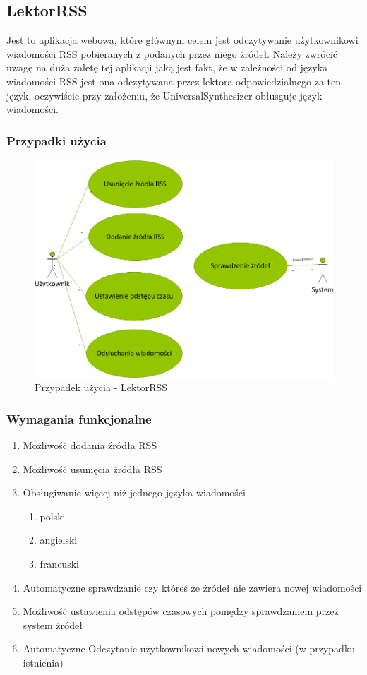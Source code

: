 \subsection{LektorRSS}
Jest to aplikacja webowa, które głównym celem jest odczytywanie użytkownikowi wiadomości RSS pobieranych z podanych przez niego źródeł. Należy zwrócić uwagę na duża zaletę tej aplikacji jaką jest fakt, że w zależności od języka wiadomości RSS jest ona odczytywana przez lektora odpowiedzialnego za ten język, oczywiście przy założeniu, że UniversalSynthesizer obłusguje język wiadomości.
\subsubsection{Przypadki użycia}
\begin{figure}[!h]
	\centering
	\includegraphics[scale=0.45]{useCaseRSS.png} 
	\caption{Przypadek użycia - LektorRSS}
\end{figure}

\subsubsection{Wymagania funkcjonalne}
\begin{enumerate}
	\item Możliwość dodania źródła RSS
	\item Możliwość usunięcia źródła RSS
	\item Obsługiwanie więcej niż jednego języka wiadomości
		\begin{enumerate}
			\item polski
			\item angielski
			\item francuski
		\end{enumerate}
	\item Automatyczne sprawdzanie czy któreś ze źródeł nie zawiera nowej wiadomości
	\item Możliwość ustawienia odstępów czasowych pomędzy sprawdzaniem przez system źródeł
	\item Automatyczne Odczytanie użytkownikowi nowych wiadomości (w przypadku istnienia) 
\end{enumerate}  
